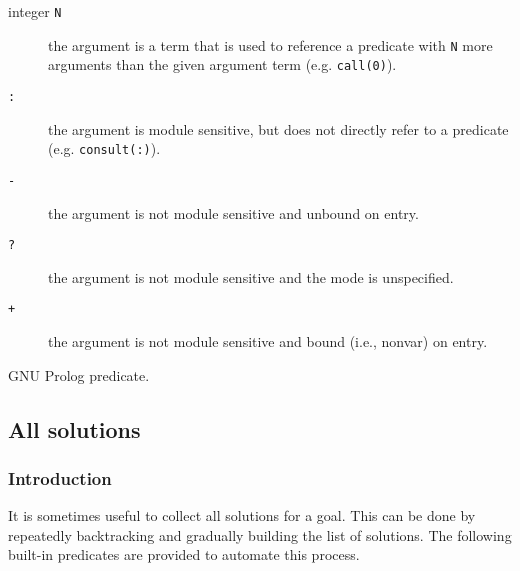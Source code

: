 \begin{itemize}
\begin{description}
\item [integer \texttt{N}] the argument is a term that is used to reference a
  predicate with \texttt{N} more arguments than the given argument term (e.g. \texttt{call(0)}).

\item [\texttt{:}] the argument is module sensitive, but does not directly
  refer to a predicate (e.g. \texttt{consult(:)}).

\item [\texttt{-}] the argument is not module sensitive and unbound on entry.


\item [\texttt{?}] the argument is not module sensitive and the mode is unspecified.

\item [\texttt{+}] the argument is not module sensitive and bound (i.e., nonvar) on entry.

\end{description}

\end{itemize}

\begin{PlErrors}





\end{PlErrors}

\Portability

GNU Prolog predicate.

\subsection{All solutions}

\subsubsection{Introduction}
\label{Introduction:(All-solutions)}
It is sometimes useful to collect all solutions for a goal. This can be done
by repeatedly backtracking and gradually building the list of solutions. The
following built-in predicates are provided to automate this process.

